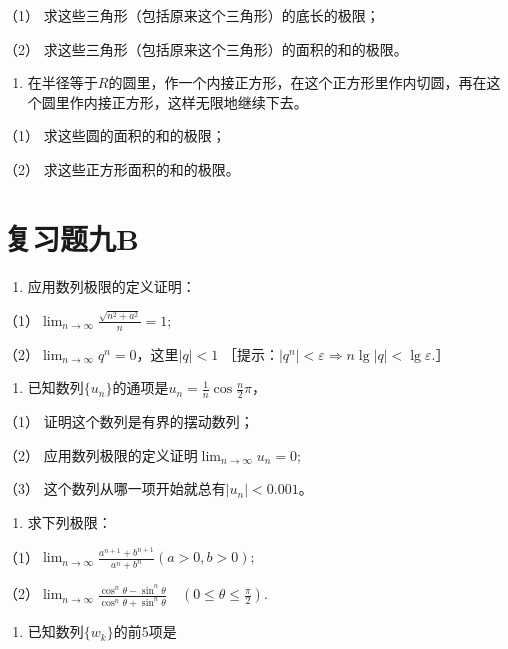 （1） 求这些三角形（包括原来这个三角形）的底长的极限；

（2） 求这些三角形（包括原来这个三角形）的面积的和的极限。

\begin{enumerate}[start=10]
\item
  在半径等于\(R\)的圆里，作一个内接正方形，在这个正方形里作内切圆，再在这个圆里作内接正方形，这样无限地继续下去。
\end{enumerate}

（1） 求这些圆的面积的和的极限；

（2） 求这些正方形面积的和的极限。

\section{复习题九B}

\begin{enumerate}
\item
  应用数列极限的定义证明：
\end{enumerate}

（1）\(\lim_{n\to \infty}\frac{\sqrt{n^2 + a^2}}{n} = 1;\)

（2）\(\lim_{n\to \infty}q^n = 0\)，这里\(|q| < 1\)
［提示：\(|q^{n}|<\varepsilon\Rightarrow n\lg|q|<\lg\varepsilon.\)］

\begin{enumerate}[start=2]
\item
  已知数列\(\{u_n\}\)的通项是\(u_n = \frac{1}{n} \cos \frac{n}{2} \pi\)，
\end{enumerate}

（1） 证明这个数列是有界的摆动数列；

（2） 应用数列极限的定义证明\(\lim_{n\to\infty}u_{n}=0;\)

（3） 这个数列从哪一项开始就总有\(|u_n| < 0.001\)。

\begin{enumerate}[start=3]
\item
  求下列极限：
\end{enumerate}

（1）\(\lim_{n\to \infty}\frac{a^{n + 1} + b^{n + 1}}{a^n + b^n}\)\((a > 0,b > 0);\)

（2）\(\lim_{n\to \infty}\frac{\cos^n\theta - \sin^n\theta}{\cos^n\theta + \sin^n\theta}\quad \left(0\leqslant \theta \leqslant \frac{\pi}{2}\right).\)

\begin{enumerate}[start=4]
\item
  已知数列\(\{w_{k}\}\)的前5项是
\end{enumerate}

